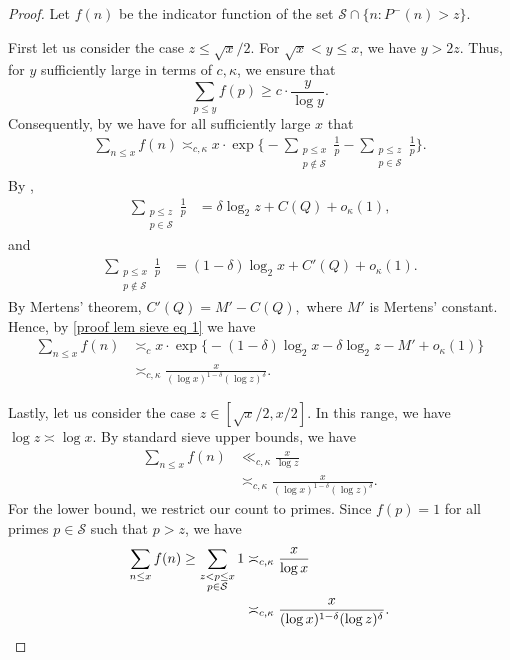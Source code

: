 \documentclass{amsart}
\theoremstyle{definition}
\numberwithin{equation}{section}
\renewcommand{\S}{\mathcal{S}}
\newcommand{\density}{\delta}
\begin{document}
	\begin{proof}
		Let $f(n)$ be the indicator function of the set $\S \cap \{n : P^{-}(n) > z\}$.
		
		\par First let us consider the case $z \leq \sqrt{x}/2$. For $\sqrt{x} < y \leq x$, we have $y > 2z$. Thus, for $y$ sufficiently large in terms of $c,\kappa$, we ensure that
		$$\sum_{p \leq y} f(p) \geq c \cdot \frac{ y}{\log y}.$$
		Consequently, by  we have for all sufficiently large $x$ that
		\begin{align}
			\sum_{n \leq x}f(n) \asymp_{c,\kappa} x \cdot \exp\bigg\{-\sum_{\substack{p \leq x \\ p \not\in \S}} \frac{1}{p} -\sum_{\substack{p \leq z \\ p \in \S}} \frac{1}{p} \bigg\}. \label{proof lem sieve eq 1}
		\end{align}
		By ,
		\begin{align*}
			\sum_{\substack{p \leq z \\ p \in \S}} \frac{1}{p} &= \density \log_2 z +C(Q) +o_\kappa(1),
		\end{align*}
		and
		\begin{align*}
			\sum_{\substack{p \leq x \\ p \not\in \S}} \frac{1}{p} &= (1-\density) \log_2 x +C'(Q) +o_\kappa(1).
		\end{align*}
		By Mertens' theorem, $C'(Q) = M'-C(Q),$ where $M'$ is Mertens' constant. Hence, by \eqref{proof lem sieve eq 1} we have
		\begin{align*}
			\sum_{n \leq x}f(n)&\asymp_c x \cdot \exp\big\{-(1-\density)\log_2 x -\density \log_2 z -M' +o_{\kappa}(1)\big\}\\
			&\asymp_{c,\kappa} \frac{x}{ (\log x)^{1-\density} (\log z)^\density}.
		\end{align*}
		
		\par Lastly, let us consider the case $z \in [\sqrt{x}/2,x/2]$. In this range, we have $\log z \asymp \log x$. By standard sieve upper bounds, we have
		\begin{align*}
			\sum_{n \leq x}f(n) &\ll_{c,\kappa} \frac{x}{\log z} \\
			&\asymp_{c,\kappa} \frac{x}{ (\log x)^{1-\density} (\log z)^\density}.
		\end{align*}
		For the lower bound, we restrict our count to primes. Since $f(p) = 1$ for all primes $p \in \S$ such that $p > z$, we have
		\begin{align*}
			\sum_{n \leq x}f(n) \geq \sum_{\substack{z < p \leq x \\ p \in \S}} 1 &\asymp_{c,\kappa} \frac{x}{\log x} \\
			&\asymp_{c,\kappa} \frac{x}{ (\log x)^{1-\density} (\log z)^\density}. \qedhere
		\end{align*}
	\end{proof}
\end{document}
